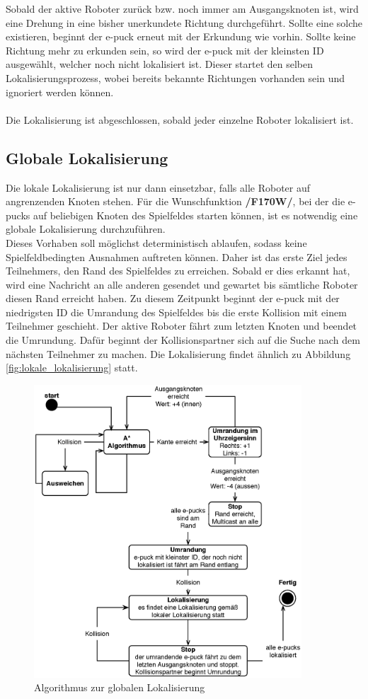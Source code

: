 \documentclass[10pt,a4paper]{article}
\begin{document}
			Sobald der aktive Roboter zurück bzw. noch immer am Ausgangsknoten ist, wird eine Drehung in eine bisher unerkundete Richtung
			durchgeführt. Sollte eine solche existieren, beginnt der e-puck erneut mit der Erkundung wie vorhin. Sollte keine Richtung mehr zu
			erkunden sein, so wird der e-puck mit der kleinsten ID ausgewählt, welcher noch nicht lokalisiert ist. Dieser startet den selben
			Lokalisierungsprozess, wobei bereits bekannte Richtungen vorhanden sein und ignoriert werden können. \\ \\
			Die Lokalisierung ist abgeschlossen, sobald jeder einzelne Roboter lokalisiert ist.
		\subsection{Globale Lokalisierung}
			Die lokale Lokalisierung ist nur dann einsetzbar, falls alle Roboter auf angrenzenden Knoten stehen. Für die Wunschfunktion
			\textbf{/F170W/}, bei der die e-pucks auf beliebigen Knoten des Spielfeldes starten können, ist es notwendig eine globale Lokalisierung
			durchzuführen. \\
			Dieses Vorhaben soll möglichst deterministisch ablaufen, sodass keine Spielfeldbedingten Ausnahmen auftreten können. Daher ist das
			erste Ziel jedes Teilnehmers, den Rand des Spielfeldes zu erreichen. Sobald er dies erkannt hat, wird eine Nachricht an alle anderen
			gesendet und gewartet bis sämtliche Roboter diesen Rand erreicht haben. Zu diesem Zeitpunkt beginnt der e-puck mit der niedrigsten
			ID die Umrandung des Spielfeldes bis die erste Kollision mit einem Teilnehmer geschieht. Der aktive Roboter fährt zum letzten Knoten
			und beendet die Umrundung. Dafür beginnt der Kollisionspartner sich auf die Suche nach dem nächsten Teilnehmer zu machen. Die 
			Lokalisierung findet ähnlich zu Abbildung \ref{fig:lokale_lokalisierung} statt.
		 	\begin{figure}[h]
				\centering
				\includegraphics[width=10cm]{images/globale_lokalisierung.eps}
  				\caption{Algorithmus zur globalen Lokalisierung}
  				\label{fig:globale_lokalisierung}
  			\end{figure}
\end{document}
